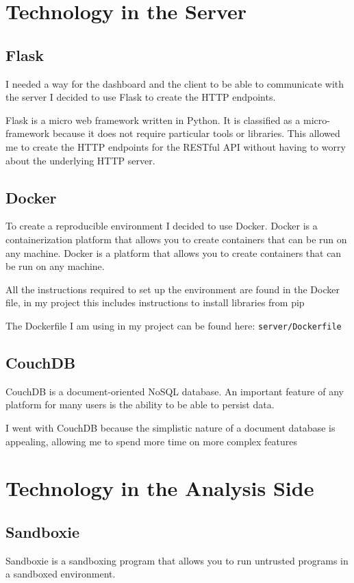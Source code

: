 \section{Technology in the Server}
\subsection{Flask}
I needed a way for the dashboard and the client to be able to communicate with the server
I decided to use Flask to create the HTTP endpoints.

Flask is a micro web framework written in Python.
It is classified as a micro-framework because it does not require particular tools or libraries.
This allowed me to create the HTTP endpoints for the RESTful API without having to worry about the underlying HTTP server.

\subsection{Docker}
To create a reproducible environment I decided to use Docker.
Docker is a containerization platform that allows you to create containers that can be run on any machine.
Docker is a platform that allows you to create containers that can be run on any machine.

All the instructions required to set up the environment are found in the Docker file, in my project this includes instructions to install libraries from pip

The Dockerfile I am using in my project can be found here: \texttt{server/Dockerfile}

\subsection{CouchDB}
CouchDB is a document-oriented NoSQL database.
An important feature of any platform for many users is the ability to be able to persist data.

I went with CouchDB because the simplistic nature of a document database is appealing,
allowing me to spend more time on more complex features

\section{Technology in the Analysis Side}
\subsection{Sandboxie}
Sandboxie is a sandboxing program that allows you to run untrusted programs in a sandboxed environment.

